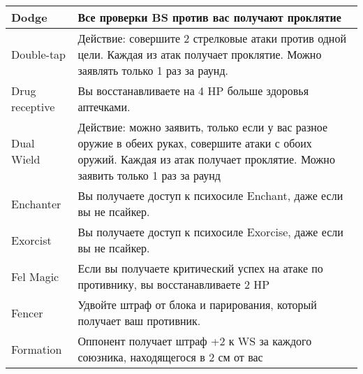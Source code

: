 \begin{table}[h]
\begin{tabularx}{\textwidth}{|l|X|}
    Dodge              & Все проверки BS против вас получают проклятие                                                                                                                                                                                      \\ \hline
    Double-tap         & Действие: совершите 2 стрелковые атаки против одной цели. Каждая из атак получает проклятие. Можно заявлять только 1 раз за раунд.                                                                                                 \\ \hline
    Drug receptive     & Вы восстанавливаете на 4 HP больше здоровья аптечками.                                                                                                                                                                             \\ \hline
    Dual Wield         & Действие: можно заявить, только если у вас разное оружие в обеих руках, совершите атаки с обоих оружий. Каждая из атак получает проклятие. Можно заявить только 1 раз за раунд                                                     \\ \hline
    Enchanter          & Вы получаете доступ к психосиле Enchant, даже если вы не псайкер.                                                                                                                                                                  \\ \hline
    Exorcist           & Вы получаете доступ к психосиле Exorcise, даже если вы не псайкер.                                                                                                                                                                 \\ \hline
    Fel Magic          & Если вы получаете критический успех на атаке по противнику, вы восстанавливаете 2 HP                                                                                                                                               \\ \hline
    Fencer             & Удвойте штраф от блока и парирования, который получает ваш противник.                                                                                                                                                              \\ \hline
    Formation          & Оппонент получает штраф +2 к WS за каждого союзника, находящегося в 2 см от вас                                                                                                                                                    \\ \hline

\end{tabularx}
\end{table}
